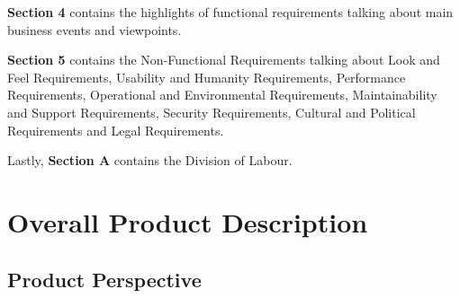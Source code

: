 \documentclass[]{article}
\begin{document}
\textbf{Section 4} contains the highlights of functional requirements talking about main business events and viewpoints. 

\textbf{Section 5} contains the Non-Functional Requirements talking about Look and Feel Requirements, Usability and Humanity Requirements, Performance Requirements, Operational and Environmental Requirements, Maintainability and Support Requirements, Security Requirements, Cultural and Political Requirements and Legal Requirements. 

Lastly, \textbf{Section A} contains the Division of Labour.


\newpage
\section{Overall Product Description}
\label{sec:overall_description}

\subsection{Product Perspective}
\label{sub:product_perspective}

\end{document}
